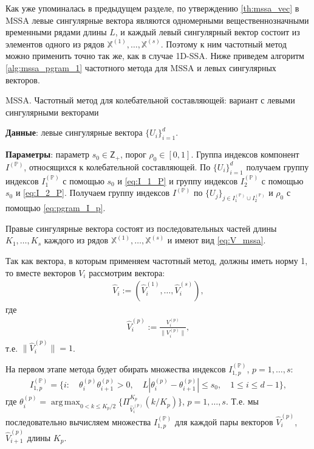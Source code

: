 \documentclass[specialist,
               substylefile = spbu.rtx,
               subf,href,colorlinks=true, 12pt]{disser}
\def\argmax{\mathop{\mathrm{argmax}}}
\def\argmax{\mathop{\mathrm{arg\,max}}}
\begin{document}
Как уже упоминалась в предыдущем разделе, по утверждению \ref{th:mssa_vec} в MSSA левые сингулярные вектора являются одномерными вещественнозначными временными рядами длины $L$, и каждый левый сингулярный вектор состоит из элементов одного из 
рядов $\mathbb{X}^{(1)}, \ldots, \mathbb{X}^{(s)}$. Поэтому к ним частотный метод можно применить точно так же, как в случае 1D-SSA. Ниже приведем алгоритм \ref{alg:mssa_pgram_1} частотного метода для MSSA и левых сингулярных векторов.

\begin{algorithm}[!hhh]
\caption{MSSA. Частотный метод для колебательной составляющей: вариант с левыми сингулярными векторами}
\label{alg:mssa_pgram_1}
\begin{algorithmic}[1]
\REQUIRE
\item \textbf{Данные}: левые сингулярные вектора $\{U_i\}_{i=1}^{d}$.
\item \textbf{Параметры}: параметр $s_0 \in \mathsf{Z}_{+}$, порог $\rho_0 \in [0,1]$.
\ENSURE Группа индексов компонент $I^{(\mathbb{P})}$, относящихся к колебательной составляющей.
\STATE  По $\{U_i\}_{i=1}^{d}$ получаем группу индексов $I_1^{(\mathbb{P})}$ с помощью $s_0$ и \eqref{eq:I_1_P} и группу индексов $I_2^{(\mathbb{P})}$ с помощью $s_0$ и \eqref{eq:I_2_P}.
\STATE Получаем группу индексов $I^{(\mathbb{P})}$ по $\{U_j\}_{j \in I_1^{(\mathbb{P})} \cup I_2^{(\mathbb{P})}}$ и $\rho_0$ с помощью \eqref{eq:pgram_I_p}.
\end{algorithmic}
\end{algorithm}

Правые сингулярные вектора
состоят из последовательных частей длины $K_1,\ldots,K_s$ каждого из рядов $\mathbb{X}^{(1)}, \ldots, \mathbb{X}^{(s)}$ и имеют вид \eqref{eq:V_mssa}.

Так как вектора, в которым применяем частотный метод, должны иметь норму 1, то вместе векторов $V_i$ рассмотрим вектора: 
\begin{gather*}
\widehat{V}_{i} := \left(\widehat{V}_i^{(1)}, \ldots, \widehat{V}_i^{(s)}\right),
\end{gather*}
где
\begin{gather*} \label{eq:V_norm_mssa}
\widehat{V}_i^{(p)} := \frac{V_i^{(p)}}{\|V_i^{(p)} \|},
\end{gather*}
т.е. $\| \widehat{V}_i^{(p)} \| = 1$. 

На первом этапе метода будет обирать множества индексов $I_{1,p}^{(\mathbb{P})}$, $p=1,\ldots,s$:
\begin{gather} \label{eq:I_1_P_mssa}
I_{1,p}^{(\mathbb{P})} = \{ i: \quad \theta_{i}^{(p)} \theta_{i+1} ^{(p)} >0, \quad L |\theta_i^{(p)} - \theta_{i+1}^{(p)}| \leqslant s_0, \quad 1 \leqslant i \leqslant d -1  \},
\end{gather}
где $\theta_i^{(p)} = \argmax_{0 < k \leqslant K_p/2} \{\Pi_{\widehat{V}_i^{(p)}}^{K_p}(k/{K_p})\}$, $p=1,\ldots,s$.
Т.е. 
мы последовательно вычисляем множества $I_{1,p}^{(\mathbb{P})}$ для каждой пары векторов  $\widehat{V}_i^{(p)}$, $\widehat{V}_{i+1}^{(p)}$ длины $K_p$.
\end{document}
